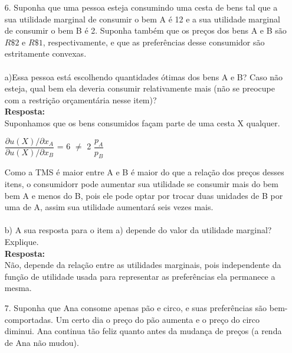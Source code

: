 \begin{enumerate}
\begin{center}
			\end{center} 
			
\item[6.] Suponha que uma pessoa esteja consumindo uma cesta de bens tal que a sua utilidade marginal de consumir o bem A é 12 e a sua utilidade marginal de consumir o bem B é 2. Suponha também que os preços dos bens A e B são {$R\$ 2$} e {$R\$ 1$}, respectivamente, e que as preferências desse consumidor são estritamente convexas.\\

\paragraph{} a)Essa pessoa está escolhendo quantidades ótimas dos bens A e B? Caso não esteja, qual bem ela deveria consumir relativamente mais (não se preocupe com a restrição orçamentária nesse item)?\\

\textbf{Resposta:}\\

Suponhamos que os bens consumidos façam parte de uma cesta X qualquer.\\
 \begin{center}
 {$\dfrac{\partial u{(X)}/\partial{x_A}}{\partial u{(X)}/\partial{x_B}}$} = 6 {$\neq$} 2 {$\dfrac{p_A}{p_B}$}\\ 
 
 \end{center}
Como a TMS é maior entre A e B é maior do que a relação dos preços desses itens, o consumidorr pode aumentar sua utilidade se consumir mais do bem bem A e menos do B, pois ele pode optar por trocar duas unidades de B por uma de A, assim sua utilidade aumentará seis vezes mais. \\
 

\paragraph{} b) A sua resposta para o item a) depende do valor da utilidade marginal? Explique.\\

\textbf{Resposta:}\\

Não, depende da relação entre as utilidades marginais, pois independente da função de utilidade usada para representar as preferências ela permanece a mesma.\\


\item[7.] Suponha que Ana consome apenas pão e circo, e suas preferências são bem-comportadas. Um certo dia o preço do pão aumenta e o preço do circo diminui. Ana continua tão feliz quanto antes da mudança de preços (a renda de Ana não mudou).\\


\end{enumerate}
